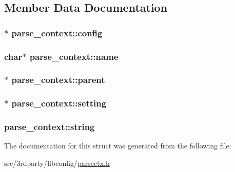 \subsection{Member Data Documentation}
\hypertarget{structparse__context_aa200e722cbeaa2486da5c03113a630de}{
\subsubsection[{config}]{$\ast$ parse\-\_\-context\-::config}}\label{structparse__context_aa200e722cbeaa2486da5c03113a630de}
\hypertarget{structparse__context_a011e6f556f380ddb7ea6443310638d19}{
\subsubsection[{name}]{\setlength{\rightskip}{0pt plus 5cm}char$\ast$ parse\-\_\-context\-::name}}\label{structparse__context_a011e6f556f380ddb7ea6443310638d19}
\hypertarget{structparse__context_a79ae4fb7bb22de08f7f99c8478187e22}{
\subsubsection[{parent}]{$\ast$ parse\-\_\-context\-::parent}}\label{structparse__context_a79ae4fb7bb22de08f7f99c8478187e22}
\hypertarget{structparse__context_ab305aaa8de50d2803f062652b350d0e1}{
\subsubsection[{setting}]{$\ast$ parse\-\_\-context\-::setting}}\label{structparse__context_ab305aaa8de50d2803f062652b350d0e1}
\hypertarget{structparse__context_aa69b91bd3127bb918700074992130b4a}{
\subsubsection[{string}]{ parse\-\_\-context\-::string}}\label{structparse__context_aa69b91bd3127bb918700074992130b4a}


The documentation for this struct was generated from the following file\-:\begin{DoxyCompactItemize}
\item 
src/3rdparty/libconfig/\hyperlink{parsectx_8h}{parsectx.\-h}\end{DoxyCompactItemize}
